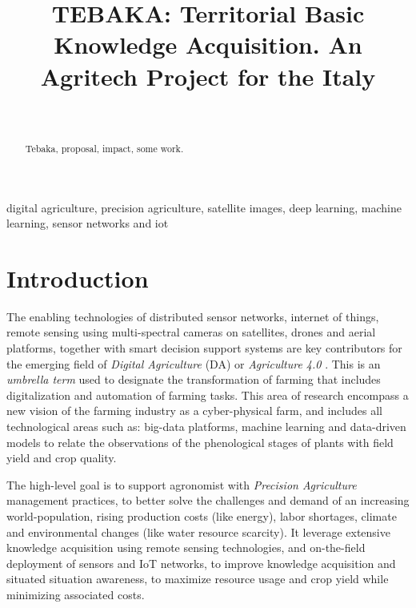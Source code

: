 \documentclass[comsoc,final]{IEEEtran}
\begin{document}

\title{\textsc{TEBAKA}: Territorial Basic Knowledge Acquisition. An Agritech Project for the Italy}
\author{\\
}

\maketitle

\begin{abstract}
Tebaka, proposal, impact, some work. \lipsum[1]
\end{abstract}

\begin{IEEEkeywords}
digital agriculture, precision agriculture, satellite images, deep learning, machine learning,
sensor networks and iot
\end{IEEEkeywords}


\section{Introduction}

The enabling technologies of distributed sensor networks, internet of things, remote sensing using multi-spectral cameras on satellites, drones and aerial platforms, together with smart decision support systems are key contributors for the emerging field of \emph{Digital Agriculture} (DA) or \emph{Agriculture 4.0} \cite{de2018agriculture}. 
This is an \emph{umbrella term} used to designate the transformation of farming that includes digitalization and automation of farming tasks. This area of research encompass a new vision of the farming industry as a cyber-physical farm, and includes all technological areas such as: big-data platforms, machine learning and data-driven models to relate the observations of the phenological stages of plants with field yield and crop quality. 

The high-level goal is to support agronomist with \emph{Precision Agriculture} management practices, to better solve the challenges and demand of an increasing world-population, rising production costs (like energy), labor shortages, climate and environmental changes (like water resource scarcity). It leverage extensive knowledge acquisition using remote sensing technologies, and on-the-field deployment of sensors and IoT networks, to improve knowledge acquisition and situated situation awareness, to maximize resource usage and crop yield while minimizing associated costs.
\end{document}
